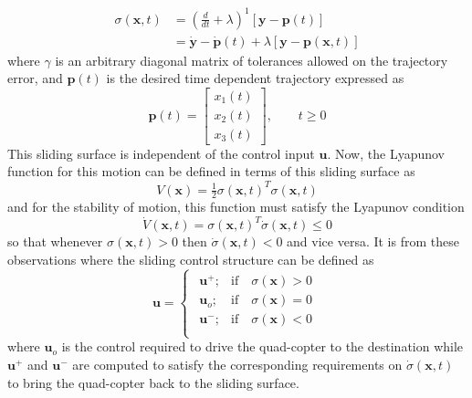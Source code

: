 \documentclass[twocolumn,10pt]{asme2e}
\begin{document}
{\begin{align}\sigma(\textbf{x},t)&=\left(\frac{d}{dt}+\lambda\right)^1\left[\textbf{y}-\textbf{p}(t)\right]\\
&=\dot{\textbf{y}}-\dot{\textbf{p}}(t)+\lambda\left[\textbf{y}-\textbf{p}(\textbf{x},t)\right]\label{eq37}\end{align} 
where $\gamma$ is an arbitrary diagonal matrix  of tolerances allowed on the trajectory error, and $\textbf{p}(t)$ is the desired time dependent trajectory expressed as
\begin{equation}\textbf{p}(t)=\left[\begin{array}{c}
	x_1(t)\\
	x_2(t)\\
	x_3(t)
\end{array}\right],\qquad t\ge0\end{equation}
This sliding surface is independent of the control input $\textbf{u}.$
Now, the Lyapunov function for this motion can be defined in terms of this sliding surface as
\begin{equation}V(\textbf{x})=\tfrac{1}{2}\sigma(\textbf{x},t)^T\sigma(\textbf{x},t)\end{equation}
and for the stability of motion, this function must satisfy the Lyapunov condition
\begin{equation}\dot{V}(\textbf{x},t)=\sigma(\textbf{x},t)^T\dot\sigma(\textbf{x},t)\le0\end{equation}
so that whenever $\sigma(\textbf{x},t)>0$ then $\dot\sigma(\textbf{x},t)<0$ and vice versa. It is from these observations where the sliding control structure can be defined as
\begin{equation}
	\textbf{u}=\begin{cases}
		\begin{array}{lr}
			\textbf{u}^{+}; &  \text{if}\quad \sigma(\textbf{x})>0\\  
			\textbf{u}_o; &  \text{if}\quad \sigma(\textbf{x})=0\\  
			\textbf{u}^{-}; &  \text{if}\quad \sigma(\textbf{x})<0\\
		\end{array}
	\end{cases}\label{eq44}
\end{equation}
where $\textbf{u}_o$ is the control required to drive the quad-copter to the destination while $\textbf{u}^{+}$ and $\textbf{u}^{-}$ are computed to satisfy the corresponding requirements on $\dot\sigma(\textbf{x},t)$ to bring the quad-copter back to the sliding surface.


}
\end{document}
